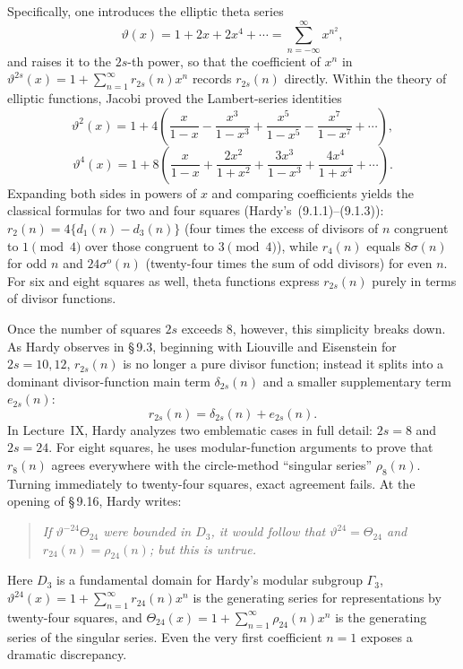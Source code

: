 Specifically, one introduces the elliptic theta series
\begin{equation*}\tag{9.2.1}
\vartheta(x)=1+2x+2x^4+\cdots=\sum_{n=-\infty}^{\infty}x^{n^2},
\end{equation*}
and raises it to the $2s$-th power, so that the coefficient of $x^n$ in $\vartheta^{2s}(x)=1+\sum_{n=1}^{\infty}r_{2s}(n)x^n$ records $r_{2s}(n)$ directly. Within the theory of elliptic functions, Jacobi proved the Lambert-series identities
\begin{equation*}\tag{9.2.2}
\vartheta^2(x)=1+4\left(\frac{x}{1-x}-\frac{x^3}{1-x^3}+\frac{x^5}{1-x^5}-\frac{x^7}{1-x^7}+\cdots\right),
\end{equation*}
\begin{equation*}\tag{9.2.3}
\vartheta^4(x)=1+8\left(\frac{x}{1-x}+\frac{2x^2}{1+x^2}+\frac{3x^3}{1-x^3}+\frac{4x^4}{1+x^4}+\cdots\right).
\end{equation*}
Expanding both sides in powers of $x$ and comparing coefficients yields the classical formulas for two and four squares (Hardy's~(9.1.1)--(9.1.3)): $r_2(n)=4\{d_1(n)-d_3(n)\}$ (four times the excess of divisors of $n$ congruent to $1\pmod 4$ over those congruent to $3\pmod 4$), while $r_4(n)$ equals $8\sigma(n)$ for odd $n$ and $24\sigma^o(n)$ (twenty-four times the sum of odd divisors) for even $n$. For six and eight squares as well, theta functions express $r_{2s}(n)$ purely in terms of divisor functions.

Once the number of squares $2s$ exceeds $8$, however, this simplicity breaks down. As Hardy observes in \S\,9.3, beginning with Liouville and Eisenstein for $2s=10,12$, $r_{2s}(n)$ is no longer a pure divisor function; instead it splits into a dominant divisor-function main term $\delta_{2s}(n)$ and a smaller supplementary term $e_{2s}(n)$:
\[
r_{2s}(n)=\delta_{2s}(n)+e_{2s}(n).
\]
In Lecture~IX, Hardy analyzes two emblematic cases in full detail: $2s=8$ and $2s=24$. For eight squares, he uses modular-function arguments to prove that $r_8(n)$ agrees everywhere with the circle-method ``singular series'' $\rho_8(n)$. Turning immediately to twenty-four squares, exact agreement fails. At the opening of \S\,9.16, Hardy writes:
\begin{quote}
\itshape
If $\vartheta^{-24}\Theta_{24}$ were bounded in $D_3$, it would follow that $\vartheta^{24}=\Theta_{24}$ and $r_{24}(n)=\rho_{24}(n)$; but this is untrue.
\end{quote}

Here $D_3$ is a fundamental domain for Hardy's modular subgroup $\Gamma_3$, $\vartheta^{24}(x)=1+\sum_{n=1}^{\infty}r_{24}(n)x^n$ is the generating series for representations by twenty-four squares, and $\Theta_{24}(x)=1+\sum_{n=1}^{\infty}\rho_{24}(n)x^n$ is the generating series of the singular series. Even the very first coefficient $n=1$ exposes a dramatic discrepancy.

